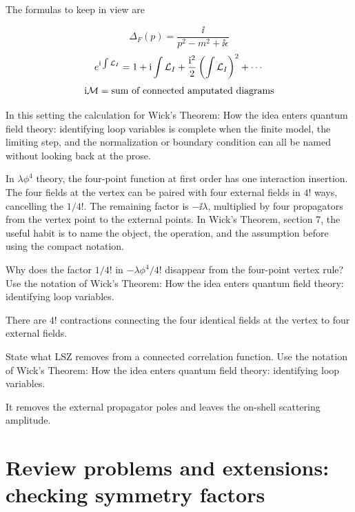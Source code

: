 The formulas to keep in view are

\[
  \Delta_F(p)=\frac{\ii}{p^2-m^2+\ii\epsilon}
\]
\[
  e^{\mathrm i\int\mathcal L_I}=1+\mathrm i\int\mathcal L_I+\frac{\mathrm i^2}{2}\left(\int\mathcal L_I\right)^2+\cdots
\]
\[
  \mathrm i\mathcal M=\hbox{sum of connected amputated diagrams}
\]

In this setting the calculation for Wick's Theorem: How the idea enters quantum field theory: identifying loop variables is complete when the finite model, the limiting step, and the normalization or boundary condition can all be named without looking back at the prose.




\begin{example}
In \(\lambda\phi^4\) theory, the four-point function at first order has one interaction insertion.  The four fields at the vertex can be paired with four external fields in \(4!\) ways, cancelling the \(1/4!\).  The remaining factor is \(-\ii\lambda\), multiplied by four propagators from the vertex point to the external points.  In Wick's Theorem, section 7, the useful habit is to name the object, the operation, and the assumption before using the compact notation.
\end{example}



\begin{exercise}
Why does the factor \(1/4!\) in \(-\lambda\phi^4/4!\) disappear from the four-point vertex rule?  Use the notation of Wick's Theorem: How the idea enters quantum field theory: identifying loop variables.
\begin{answer}
There are \(4!\) contractions connecting the four identical fields at the vertex to four external fields.
\end{answer}
\end{exercise}

\begin{exercise}
State what LSZ removes from a connected correlation function.  Use the notation of Wick's Theorem: How the idea enters quantum field theory: identifying loop variables.
\begin{answer}
It removes the external propagator poles and leaves the on-shell scattering amplitude.
\end{answer}
\end{exercise}



\section{Review problems and extensions: checking symmetry factors}


